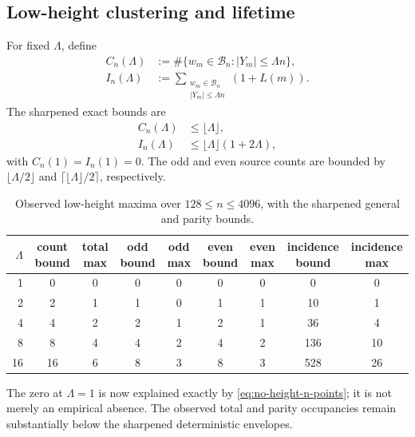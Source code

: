 \subsection{Low-height clustering and lifetime}

For fixed $\Lambda$, define
\begin{align}
 C_n(\Lambda)
 &:={\#}\{w_m\in\mathscr B_n:|Y_m|\le\Lambda n\},
 \label{eq:C-lambda}\\
 I_n(\Lambda)
 &:={\sum}_{\substack{w_m\in\mathscr B_n\\|Y_m|\le\Lambda n}}
 (1+L(m)).
 \label{eq:I-lambda}
\end{align}
The sharpened exact bounds are
\begin{align}
 C_n(\Lambda)&\le\lfloor\Lambda\rfloor,
 \label{eq:C-pass}\\
 I_n(\Lambda)&\le\lfloor\Lambda\rfloor(1+2\Lambda),
 \label{eq:I-pass}
\end{align}
with $C_n(1)=I_n(1)=0$.  The odd and even source counts are bounded by $\lfloor\Lambda/2\rfloor$ and $\lceil\lfloor\Lambda\rfloor/2\rceil$, respectively.

\begin{table}[htbp]
\centering
\caption{Observed low-height maxima over $128\le n\le4096$, with the sharpened general and parity bounds.}
\label{tab:low-height-numerical}
\scriptsize
\setlength{\tabcolsep}{3.5pt}
\begin{tabular}{rcccccccc}
\toprule
$\Lambda$ &
count bound & total max &
odd bound & odd max &
even bound & even max &
incidence bound & incidence max\\
\midrule
1  & 0  & 0 & 0 & 0 & 0 & 0 & 0   & 0\\
2  & 2  & 1 & 1 & 0 & 1 & 1 & 10  & 1\\
4  & 4  & 2 & 2 & 1 & 2 & 1 & 36  & 4\\
8  & 8  & 4 & 4 & 2 & 4 & 2 & 136 & 10\\
16 & 16 & 6 & 8 & 3 & 8 & 3 & 528 & 26\\
\bottomrule
\end{tabular}
\end{table}

The zero at $\Lambda=1$ is now explained exactly by \cref{eq:no-height-n-points}; it is not merely an empirical absence. The observed total and parity occupancies remain substantially below the sharpened deterministic envelopes.
